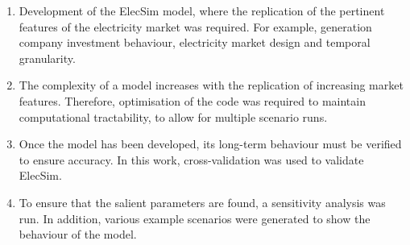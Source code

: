 \documentclass[11pt]{report}
\begin{document}
\begin{enumerate}
	\item Development of the ElecSim model, where the replication of the pertinent features of the electricity market was required. For example, generation company investment behaviour, electricity market design and temporal granularity.
	\item The complexity of a model increases with the replication of increasing market features. Therefore, optimisation of the code was required to maintain computational tractability, to allow for multiple scenario runs. 
	\item Once the model has been developed, its long-term behaviour must be verified to ensure accuracy. In this work, cross-validation was used to validate ElecSim.
	\item To ensure that the salient parameters are found, a sensitivity analysis was run. In addition, various example scenarios were generated to show the behaviour of the model.
\end{enumerate}
\end{document}
